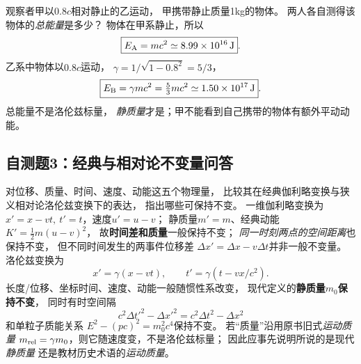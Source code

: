 \problemtext 观察者甲以$0.8c$相对静止的乙运动，
甲携带静止质量1kg的物体。
两人各自测得该物体的\emph{总能量}是多少？
\workings
物体在甲系静止，所以
\[
\boxed{E_{\rm A}=mc^2
\simeq8.99\times10^{16}\,\mathrm J}.
\]
乙系中物体以$0.8c$运动，
$\gamma=1/\sqrt{1-0.8^2}=5/3$，
\[
\boxed{E_{\rm B}=\gamma mc^2
=\tfrac53mc^2
\simeq1.50\times10^{17}\,\mathrm J}.
\]
\crosscheck 总能量不是洛伦兹标量，
\emph{静质量}才是；甲不能看到自己携带的物体有额外平动动能。

\subsection{自测题3：经典与相对论不变量问答}

\problemtext 对位移、质量、时间、速度、动能这五个物理量，
比较其在经典伽利略变换与狭义相对论洛伦兹变换下的表达，
指出哪些可保持不变。
\workings
一维伽利略变换为
$x'=x-vt,\ t'=t$，速度$u'=u-v$；
静质量$m'=m$、经典动能
$K'=\tfrac12m(u-v)^2$，
故\textbf{时间差和质量}一般保持不变；
\emph{同一时刻两点的空间距离}也保持不变，
但不同时间发生的两事件位移差
$\Delta x'=\Delta x-v\Delta t$并非一般不变量。
洛伦兹变换为
\[
x'=\gamma(x-vt),\qquad
t'=\gamma(t-vx/c^2).
\]
长度/位移、坐标时间、速度、动能一般随惯性系改变，
现代定义的\textbf{静质量$m_0$保持不变}，
同时有时空间隔
\[
\boxed{c^2\Delta t'^2-\Delta x'^2
=c^2\Delta t^2-\Delta x^2}
\]
和单粒子质能关系
$\boxed{E^2-(pc)^2=m_0^2c^4}$保持不变。
\crosscheck 若“质量”沿用原书旧式\emph{运动质量}
$m_{\rm rel}=\gamma m_0$，则它随速度变，不是洛伦兹标量；
因此应事先说明所说的是现代\emph{静质量}
还是教材历史术语的\emph{运动质量}。
